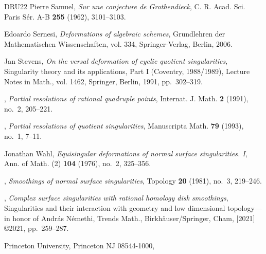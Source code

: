 \documentclass{amsart}
\theoremstyle{definition}
\theoremstyle{remark}
\begin{document}
\begin{thebibliography}{DRU22}
Pierre Samuel, \emph{Sur une conjecture de {G}rothendieck}, C. R. Acad. Sci.
  Paris S\'{e}r. A-B \textbf{255} (1962), 3101--3103.

Edoardo Sernesi, \emph{Deformations of algebraic schemes}, Grundlehren der
  Mathematischen Wissenschaften, vol. 334, Springer-Verlag, Berlin, 2006.

Jan Stevens, \emph{On the versal deformation of cyclic quotient singularities},
  Singularity theory and its applications, {P}art {I} ({C}oventry, 1988/1989),
  Lecture Notes in Math., vol. 1462, Springer, Berlin, 1991, pp.~302--319.

\bysame, \emph{Partial resolutions of rational quadruple points}, Internat. J.
  Math. \textbf{2} (1991), no.~2, 205--221. 

\bysame, \emph{Partial resolutions of quotient singularities}, Manuscripta
  Math. \textbf{79} (1993), no.~1, 7--11. 

Jonathan Wahl, \emph{Equisingular deformations of normal surface singularities.
  {I}}, Ann. of Math. (2) \textbf{104} (1976), no.~2, 325--356. 

\bysame, \emph{Smoothings of normal surface singularities}, Topology
  \textbf{20} (1981), no.~3, 219--246. 

\bysame, \emph{Complex surface singularities with rational homology disk
  smoothings}, Singularities and their interaction with geometry and low
  dimensional topology---in honor of {A}ndr\'{a}s {N}\'{e}methi, Trends Math.,
  Birkh\"{a}user/Springer, Cham, [2021] \copyright 2021, pp.~259--287.

\end{thebibliography}


 \bigskip


  Princeton University, Princeton NJ 08544-1000, \




 
\end{document}
